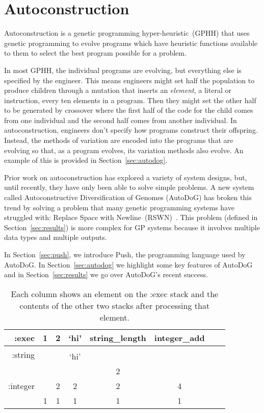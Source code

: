 \documentclass{sig-alternate}
\begin{document}
\section{Autoconstruction}
\label{sec:ac}
Autoconstruction is a genetic programming hyper-heur\-istic~(GPHH) that uses genetic programming to evolve programs which have heuristic functions available to them to select the best program possible for a problem. 

In most GPHH, the individual programs are evolving, but everything else is specified by the engineer. This means engineers might set half the population to produce children through a mutation that inserts an \textit{element}, a literal or instruction, every ten elements in a program. Then they might set the other half to be generated by crossover where the first half of the code for the child comes from one individual and the second half comes from another individual. In autoconstruction, engineers don't specify how programs construct their offspring. Instead, the methods of variation are encoded into the programs that are evolving so that, as a program evolves, its variation methods also evolve. An example of this is provided in Section~\ref{sec:autodog}.

Prior work on autoconstruction has explored a variety of system designs, but, until recently, they have only been able to solve simple problems. A new system called Autoconstructive Diversification of Genomes (AutoDoG) has broken this trend by solving a problem that many genetic programming systems have struggled with: Replace Space with Newline~(RSWN)~\cite{spector:2016}. This problem (defined in Section~\ref{sec:results}) is more complex for GP systems because it involves multiple data types and multiple outputs.

In Section~\ref{sec:push}, we introduce Push, the programming language used by AutoDoG. In Section~\ref{sec:autodog} we highlight some key features of AutoDoG and in Section~\ref{sec:results} we go over AutoDoG's recent success.

\begin{table}
	\centering
	\begin{tabular}{|r|c|c|c|c|c|c|c|}
		\hline
		:exec & 1 & 2 & `hi' & string\_length & integer\_add \\
		\hline
		\hline
		\multirow{2}{*}{:string} & & & & & \\
		& & & `hi' &  &  \\
		\hline
		\multirow{3}{*}{:integer} & & & & 2 & \\
		& & 2 & 2 & 2 & 4 \\
		& 1 & 1 & 1 & 1 & 1\\
		\hline
	\end{tabular}
	\caption{Each column shows an element on the :exec stack and the contents of the other two stacks after processing that element.}
	\label{tab:push}
\end{table}
\end{document}
